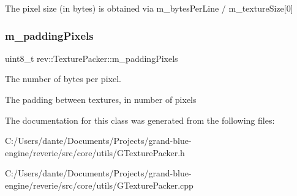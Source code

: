 The pixel size (in bytes) is obtained via m\+\_\+bytes\+Per\+Line / m\+\_\+texture\+Size\mbox{[}0\mbox{]} \mbox{\label{classrev_1_1_texture_packer_a4ca3d5f63ab64524ed7af743248a15c3}} 
\subsubsection{\texorpdfstring{m\_paddingPixels}{m\_paddingPixels}}
{\footnotesize\ttfamily uint8\+\_\+t rev\+::\+Texture\+Packer\+::m\+\_\+padding\+Pixels\hspace{0.3cm}{\ttfamily [protected]}}



The number of bytes per pixel. 

The padding between textures, in number of pixels 

The documentation for this class was generated from the following files\+:\begin{DoxyCompactItemize}
\item 
C\+:/\+Users/dante/\+Documents/\+Projects/grand-\/blue-\/engine/reverie/src/core/utils/G\+Texture\+Packer.\+h\item 
C\+:/\+Users/dante/\+Documents/\+Projects/grand-\/blue-\/engine/reverie/src/core/utils/G\+Texture\+Packer.\+cpp\end{DoxyCompactItemize}
